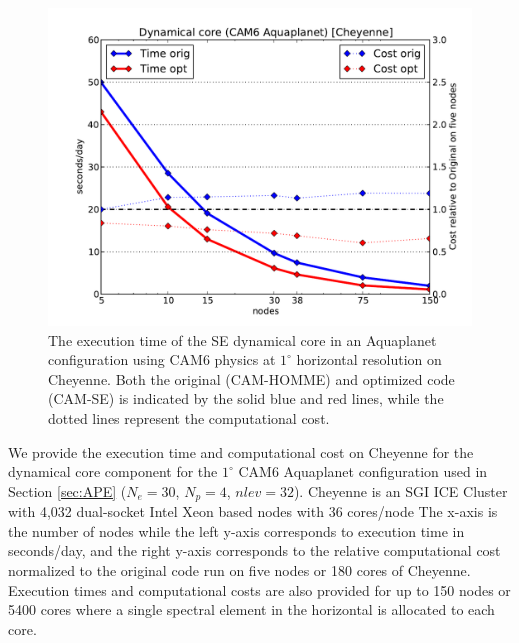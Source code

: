 \documentclass{agujournal}
\begin{document}
{\begin{figure}[h]
\centering
 \includegraphics[scale=0.45]{figs/aqua-perf}
 \caption{The execution time of the SE dynamical core in an Aquaplanet configuration using CAM6 physics at $1^\circ$ horizontal resolution on Cheyenne.   Both the original (CAM-HOMME) and optimized code (CAM-SE) is indicated by the solid blue and red lines, while the dotted lines represent the computational cost.}
 \label{fig:aqua-perf}
\end{figure}

We provide the execution time and computational cost on Cheyenne for the dynamical core component for the $1^\circ$ CAM6 Aquaplanet configuration used in Section \ref{sec:APE} ($N_e=30$, $N_p=4$, $nlev=32$). Cheyenne is an SGI ICE Cluster with 4,032 dual-socket Intel Xeon based nodes with 36 cores/node   The x-axis is the number of nodes while the left y-axis corresponds to execution time in seconds/day, and the right y-axis corresponds to the relative computational cost normalized to the original code run on five nodes or 180 cores of Cheyenne. Execution times and computational costs are also provided for up to 150 nodes or 5400 cores where a single spectral element in the horizontal is allocated to each core.

}
\end{document}
